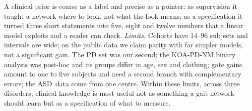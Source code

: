 \documentclass[runningheads]{llncs}
\newcommand{\asd}{ASD}
\begin{document}
A clinical prior is coarse as a label and precise as a pointer: as supervision it taught a
network where to look, not what the look means; as a specification it turned three short
statements into five, eight and twelve numbers that a linear model exploits and a reader can
check. \emph{Limits.} Cohorts have 14--96 subjects and intervals are wide; on the public
data we claim parity with far simpler models, not a significant gain. The PD set was our second; the KOA-PD-NM binary analysis was
post-hoc and its groups differ in age, sex and clothing; gate gains amount to one to five
subjects and need a second branch with complementary errors; the \asd\ data come from one
centre. Within these limits, across three disorders, clinical knowledge
is most useful not as something a gait network should learn but as a specification of
what to measure.



\end{document}
